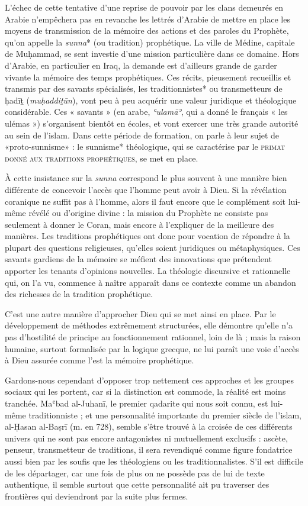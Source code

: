 L'échec de cette tentative d'une reprise de pouvoir par les clans
demeurés en Arabie n'empêchera pas en revanche les lettrés d'Arabie de
mettre en place les moyens de transmission de la mémoire des actions et
des paroles du Prophète, qu'on appelle la \emph{sunna}* (ou tradition)
prophétique. La ville de Médine, capitale de Muḥammad, se sent investie
d'une mission particulière dans ce domaine. Hors d'Arabie, en
particulier en Iraq, la demande est d'ailleurs grande de garder vivante
la mémoire des temps prophétiques. Ces récits, pieusement recueillis et
transmis par des savants spécialisés, les traditionnistes* ou
transmetteurs de ḥadīṯ (\emph{muḥaddiṯūn}), vont peu à peu acquérir une
valeur juridique et théologique considérable. Ces « savants » (en arabe,
\emph{ʿulamāʾ}, qui a donné le français « les ulémas ») s'organisent
bientôt en écoles, et vont exercer une très grande autorité au sein de
l'islam. Dans cette période de formation, on parle à leur sujet de «proto-sunnisme» : le
sunnisme* théologique, qui se caractérise par le \textsc{primat donné aux
traditions prophétiques}, se met en place.

À cette insistance sur la \emph{sunna} correspond le plus souvent à une
manière bien différente de concevoir l'accès que l'homme peut avoir à
Dieu. Si la révélation coranique ne suffit pas à l'homme, alors il faut
encore que le complément soit lui-même révélé ou d'origine divine : la
mission du Prophète ne consiste pas seulement à donner le Coran, mais
encore à l'expliquer de la meilleure des manières. Les traditions
prophétiques ont donc pour vocation de répondre à la plupart des
questions religieuses, qu'elles soient juridiques ou métaphysiques. Ces
savants gardiens de la mémoire se méfient des innovations que prétendent
apporter les tenants d'opinions nouvelles. La théologie discursive et
rationnelle qui, on l'a vu, commence à naître apparaît dans ce contexte
comme un abandon des richesses de la tradition prophétique.

C'est une autre manière d'approcher Dieu qui se met ainsi en place. Par
le développement de méthodes extrêmement structurées, elle démontre
qu'elle n'a pas d'hostilité de principe au fonctionnement rationnel,
loin de là ; mais la raison humaine, surtout formalisée par la logique
grecque, ne lui paraît une voie d'accès à Dieu assurée comme l'est la
mémoire prophétique.

Gardons-nous cependant d'opposer trop nettement ces approches et les
groupes sociaux qui les portent, car si la distinction est commode, la
réalité est moins tranchée. Maʿbad al-Juhanī, le premier qadarite qui
nous soit connu, est lui-même traditionniste ; et une personnalité
importante du premier siècle de l'islam, al-Ḥasan al-Baṣrī (m. en 728),
semble s'être trouvé à la croisée de ces différents univers qui ne sont
pas encore antagonistes ni mutuellement exclusifs : ascète, penseur,
transmetteur de traditions, il sera revendiqué comme figure fondatrice
aussi bien par les soufis que les théologiens ou les traditionnalistes.
S'il est difficile de les départager, car une fois de plus on ne possède
pas de lui de texte
authentique, il semble surtout que cette personnalité ait pu traverser
des frontières qui deviendront par la suite plus fermes.

